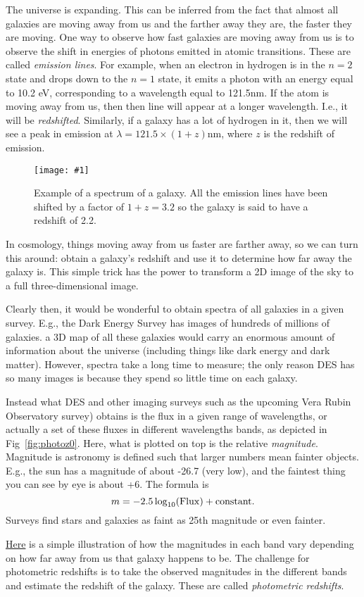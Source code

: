 \documentclass[prd,amsmath,aps,floats,amssymb, floatfix,
  superscriptaddress,nofootinbib]{revtex4-1}
\newcommand{\sfig}[2]{
\texttt{[image: \#1]}
        }
\newcommand{\Spng}[2]{
    \begin{figure}[thbp]
    \sfig{Figures/#1.png}{0.65\columnwidth}
    \caption{{\small #2}}
    \label{fig:#1}
    \end{figure}
}
\newcommand{\rf}[1]{\ref{fig:#1}}
\numberwithin{equation}{section}
\newcommand\be{\begin{equation}}
\newcommand\ee{\end{equation}}
\begin{document}
The universe is expanding. This can be inferred from the fact that almost all galaxies are moving away from us and the farther away they are, the faster they are moving. One way to observe how fast galaxies are moving away from us is to observe the shift in energies of photons emitted in atomic transitions. These are called {\it emission lines}. For example, when an electron in hydrogen is in the $n=2$ state and drops down to the $n=1$ state, it emits a photon with an energy equal to 10.2 eV, corresponding to a wavelength equal to 121.5nm. If the atom is moving away from us, then then line will appear at a longer wavelength. I.e., it will be {\it redshifted}. Similarly, if a galaxy has a lot of hydrogen in it, then we will see a peak in emission at $\lambda=121.5\times(1+z)$nm, where $z$ is the redshift of emission.

\Spng{redshift}{Example of a spectrum of a galaxy. All the emission lines have been shifted by a factor of $1+z=3.2$ so the galaxy is said to have a redshift of 2.2.}

In cosmology, things moving away from us faster are farther away, so we can turn this around: obtain a galaxy's redshift and use it to determine how far away the galaxy is. This simple trick has the power to transform a 2D image of the sky to a full three-dimensional image. 

Clearly then, it would be wonderful to obtain spectra of all galaxies in a given survey. E.g., the Dark Energy Survey has images of hundreds of millions of galaxies. a 3D map of all these galaxies would carry an enormous amount of information about the universe (including things like dark energy and dark matter). However, spectra take a long time to measure; the only reason DES has so many images is because they spend so little time on each galaxy. 

Instead what DES and other imaging surveys such as the upcoming Vera Rubin Observatory survey) obtains is the flux in a given range of wavelengths, or actually a set of these fluxes in  different wavelengths bands, as depicted in Fig~\rf{photoz0}. Here, what is plotted on top is the relative {\it magnitude}. Magnitude is astronomy is defined such that larger numbers mean fainter objects. E.g., the sun has a magnitude of about -26.7 (very low), and the faintest thing you can see by eye is about +6.
The formula is
\be
m = -2.5\log_{10}({\rm Flux}) + {\rm constant}
.\ee
Surveys find stars and galaxies as faint as 25th magnitude or even fainter. 

\href{https://www.kaggle.com/c/photometric-redshift-estimation-2019}{Here} is a simple illustration of how the magnitudes in each band vary depending on how far away from us that galaxy happens to be. The challenge for photometric redshifts is to take the observed magnitudes in the different bands and estimate the redshift of the galaxy. These are called {\it photometric redshifts}.
\end{document}
